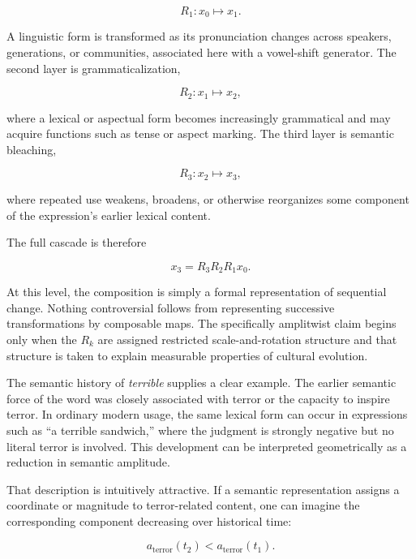 \documentclass[11pt]{article}
\begin{document}
\begin{equation}
R_1:
x_0\longmapsto x_1.
\end{equation}

A linguistic form is transformed as its pronunciation changes across speakers, generations, or communities, associated here with a vowel-shift generator. The second layer is grammaticalization,

\begin{equation}
R_2:
x_1\longmapsto x_2,
\end{equation}

where a lexical or aspectual form becomes increasingly grammatical and may acquire functions such as tense or aspect marking. The third layer is semantic bleaching,

\begin{equation}
R_3:
x_2\longmapsto x_3,
\end{equation}

where repeated use weakens, broadens, or otherwise reorganizes some component of the expression's earlier lexical content.

The full cascade is therefore

\begin{equation}
x_3
=
R_3R_2R_1x_0.
\end{equation}

At this level, the composition is simply a formal representation of sequential change. Nothing controversial follows from representing successive transformations by composable maps. The specifically amplitwist claim begins only when the $R_k$ are assigned restricted scale-and-rotation structure and that structure is taken to explain measurable properties of cultural evolution.

The semantic history of \emph{terrible} supplies a clear example. The earlier semantic force of the word was closely associated with terror or the capacity to inspire terror. In ordinary modern usage, the same lexical form can occur in expressions such as ``a terrible sandwich,'' where the judgment is strongly negative but no literal terror is involved. This development can be interpreted geometrically as a reduction in semantic amplitude.

That description is intuitively attractive. If a semantic representation assigns a coordinate or magnitude to terror-related content, one can imagine the corresponding component decreasing over historical time:

\begin{equation}
a_{\mathrm{terror}}(t_2)
<
a_{\mathrm{terror}}(t_1).
\end{equation}
\end{document}

